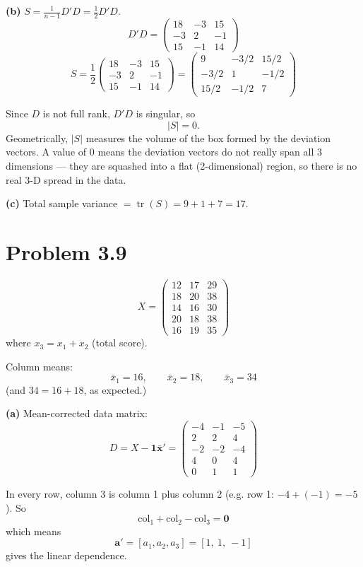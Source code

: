 \documentclass[11pt]{article}
\begin{document}
\textbf{(b)} $S=\frac1{n-1}D'D=\frac12 D'D$.
\[
D'D=\begin{pmatrix}
18 & -3 & 15\\
-3 & 2 & -1\\
15 & -1 & 14
\end{pmatrix}
\]
\[
S=\frac12\begin{pmatrix}
18 & -3 & 15\\
-3 & 2 & -1\\
15 & -1 & 14
\end{pmatrix}
=\boxed{\begin{pmatrix}
9 & -3/2 & 15/2\\
-3/2 & 1 & -1/2\\
15/2 & -1/2 & 7
\end{pmatrix}}
\]

Since $D$ is not full rank, $D'D$ is singular, so
\[
|S|=\boxed{0}.
\]
Geometrically, $|S|$ measures the volume of the box formed by the deviation vectors. A
value of $0$ means the deviation vectors do not really span all $3$ dimensions --- they
are squashed into a flat (2-dimensional) region, so there is no real 3-D spread in the data.

\textbf{(c)} Total sample variance $=\operatorname{tr}(S)=9+1+7=\boxed{17}$.

\newpage
\section*{Problem 3.9}

\[
X=\begin{pmatrix}
12 & 17 & 29\\
18 & 20 & 38\\
14 & 16 & 30\\
20 & 18 & 38\\
16 & 19 & 35
\end{pmatrix}
\]
where $x_3=x_1+x_2$ (total score).

Column means:
\[
\bar x_1=16,\qquad \bar x_2=18,\qquad \bar x_3=34
\]
(and $34=16+18$, as expected.)

\textbf{(a)} Mean-corrected data matrix:
\[
D=X-\mathbf 1\bar{\mathbf x}'=
\begin{pmatrix}
-4 & -1 & -5\\
2 & 2 & 4\\
-2 & -2 & -4\\
4 & 0 & 4\\
0 & 1 & 1
\end{pmatrix}
\]

In every row, column 3 is column 1 plus column 2 (e.g. row 1: $-4+(-1)=-5$). So
\[
\text{col}_1+\text{col}_2-\text{col}_3=\mathbf 0
\]
which means
\[
\boxed{\mathbf a'=[a_1,a_2,a_3]=[1,\ 1,\ -1]}
\]
gives the linear dependence.
\end{document}
